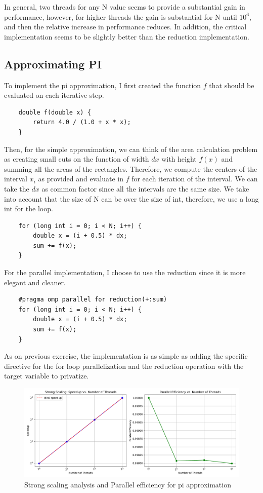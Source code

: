 \documentclass[unicode,11pt,a4paper,oneside,numbers=endperiod,openany]{scrartcl}
\begin{document}
In general, two threads for any N value seems to provide a substantial gain in performance, however, for higher threads the gain is substantial for N until $10^6$, and then the relative increase in 
performance reduces. In addition, the critical implementation seems to be slightly better than the reduction implementation. 
\subsection{Approximating PI}
To implement the pi approximation, I first created the function $f$ that should be evaluated on each iterative step. 

\begin{lstlisting}
    double f(double x) {
        return 4.0 / (1.0 + x * x);
    }
\end{lstlisting}

Then, for the simple approximation, we can think of the area calculation problem as creating small cuts on the function of width $dx$ with height $f(x)$ and summing all the areas of the rectangles.
Therefore, we compute the centers of the interval $x_i$ as provided and evaluate in $f$ for each iteration of the interval. We can take the $dx$ as common factor since all the intervals are the same size.
We take into account that the size of N can be over the size of int, therefore, we use a long int for the loop.
\begin{lstlisting}
    for (long int i = 0; i < N; i++) {
        double x = (i + 0.5) * dx; 
        sum += f(x);
    }
\end{lstlisting}

For the parallel implementation, I choose to use the reduction since it is more elegant and cleaner.

\begin{lstlisting}
    #pragma omp parallel for reduction(+:sum)
    for (long int i = 0; i < N; i++) {
        double x = (i + 0.5) * dx;
        sum += f(x);
    }
\end{lstlisting}
As on previous exercise, the implementation is as simple as adding the specific directive for the for loop 
parallelization and the reduction operation with the target variable to privatize.

\begin{figure}[H]
    \centering
    \includegraphics[width=\textwidth]{./img/exe1/pi_approximation_plots.pdf}
    \caption{Strong scaling analysis and Parallel efficiency for pi approximation}
\end{figure}
\end{document}
